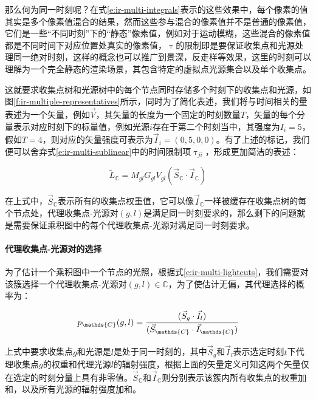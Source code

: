 那么何为同一时刻呢？在式\ref{e:ir-multi-integrals}表示的这些效果中，每个像素的值其实是多个像素值混合的结果，然而这些参与混合的像素值并不是普通的像素值，它们是一些“不同时刻”下的“静态”像素值，例如对于运动模糊，这些混合的像素值都是不同时间下对应位置处真实的像素值，$\uptau$的限制即是要保证收集点和光源处理同一绝对时刻，这样的概念也可以推广到景深，反走样等效果，这里的时刻可以理解为一个完全静态的渲染场景，其包含特定的虚拟点光源集合以及单个收集点。

这就要求收集点树和光源树中的每个节点同时存储多个时刻下的收集点和光源，如图\ref{f:ir-multiple-representatives}所示，同时为了简化表述，我们将与时间相关的量表述为一个矢量，例如$\vec{V}$，其矢量的长度为一个固定的时刻数量$T$，矢量的每个分量表示对应时刻下的标量值，例如光源$i$存在于第二个时刻当中，其强度为$I_i=5$，假如$T=4$，则对应的矢量强度可表示为$\vec{I}_i=(0,5,0,0)$。有了上述的标记，我们便可以舍弃式\ref{e:ir-multi-sublinear}中的时间限制项$\uptau_{ji}$，形成更加简洁的表述：

\begin{equation}\label{e:ir-multi-lightcuts}
	\tilde{L}_{\mathds{C}}=M_{gl}G_{gl}V_{gl}(\vec{S}_{\mathds{C}}\cdot \vec{I}_{\mathds{C}})
\end{equation}

\noindent 在上式中，$\vec{S}_{\mathds{C}}$表示所有的收集点权重值，它可以像$\vec{I}_{\mathds{C}}$一样被缓存在收集点树的每个节点处，代理收集点-光源对$(g,l)$是满足同一时刻要求的，那么剩下的问题就是需要保证乘积图中的每个代理收集点-光源对满足同一时刻要求。




\paragraph{代理收集点-光源对的选择}
为了估计一个乘积图中一个节点的光照，根据式\ref{e:ir-multi-lightcuts}，我们需要对该簇选择一个代理收集点-光源对$(g,l)\in\mathds{C}$，为了使估计无偏，其代理选择的概率为：

\begin{equation}
	p_{\mathds{C}}(g,l)= \cfrac{(\vec{S}_g \cdot \vec{I}_l)}{(\vec{S}_{\mathds{C}}\cdot \vec{I}_{\mathds{C}})}
\end{equation}

\noindent 上式中要求收集点$g$和光源是$l$是处于同一时刻的，其中$\vec{S}_g$和$\vec{I}_l$表示选定时刻$t$下代理收集点$g$的权重和代理光源$l$的辐射强度，根据上面的矢量定义可知这两个矢量仅在选定的时刻分量上具有非零值。$\vec{S}_{\mathds{C}}$和$\vec{I}_{\mathds{C}}$则分别表示该簇内所有收集点的权重加和，以及所有光源的辐射强度加和。


